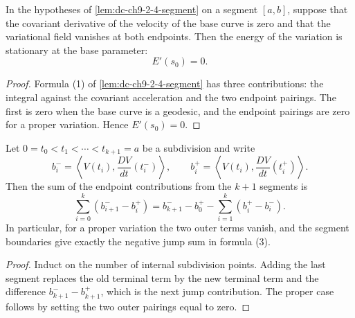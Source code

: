 \begin{lemma}
  \label{lem:dc-ch9-2-5-geodesic-energy}


  In the hypotheses of \cref{lem:dc-ch9-2-4-segment} on a segment $[a,b]$, suppose that
  the covariant derivative of the velocity of the base curve is zero and that the
  variational field vanishes at both endpoints. Then the energy of the variation is
  stationary at the base parameter:
  $$
  E'(s_0)=0.
  $$
\end{lemma}
\begin{proof}

  Formula (1) of \cref{lem:dc-ch9-2-4-segment} has three contributions: the integral
  against the covariant acceleration and the two endpoint pairings. The first is zero
  when the base curve is a geodesic, and the endpoint pairings are zero for a proper
  variation. Hence $E'(s_0)=0$.
\end{proof}

\begin{lemma}
  \label{lem:dc-ch9-2-8-jump-sum}


  Let $0=t_0<t_1<\cdots<t_{k+1}=a$ be a subdivision and write
  \[
    b_i^- = \left\langle V(t_i),\frac{DV}{dt}(t_i^-)\right\rangle,
    \qquad
    b_i^+ = \left\langle V(t_i),\frac{DV}{dt}(t_i^+)\right\rangle.
  \]
  Then the sum of the endpoint contributions from the $k+1$ segments is
  \[
    \sum_{i=0}^k (b_{i+1}^- - b_i^+)
      = b_{k+1}^- - b_0^+ - \sum_{i=1}^k (b_i^+ - b_i^-).
  \]
  In particular, for a proper variation the two outer terms vanish, and the
  segment boundaries give exactly the negative jump sum in formula (3).
\end{lemma}
\begin{proof}

  Induct on the number of internal subdivision points.  Adding the last
  segment replaces the old terminal term by the new terminal term and the
  difference $b_{k+1}^- - b_{k+1}^+$, which is the next jump contribution.
  The proper case follows by setting the two outer pairings equal to zero.
\end{proof}

